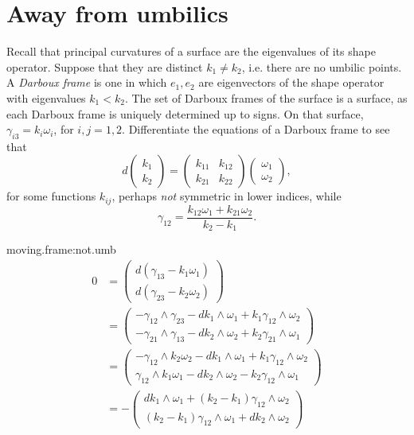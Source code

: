 \section{Away from umbilics}
Recall that principal curvatures of a surface are the eigenvalues of its shape operator.
Suppose that they are distinct \(k_1\ne k_2\), i.e. there are no umbilic points.
A \emph{Darboux frame} is one in which \(e_1,e_2\) are eigenvectors of the shape operator with eigenvalues \(k_1<k_2\).
The set of Darboux frames of the surface is a surface, as each Darboux frame is uniquely determined up to signs.
On that surface, \(\gamma_{i3}=k_i\omega_i\), for \(i,j=1,2\).
%
{Differentiate the equations of a Darboux frame to see that
\[
d
\begin{pmatrix}
k_1\\
k_2
\end{pmatrix}
=
\begin{pmatrix}
k_{11}&k_{12}\\
k_{21}&k_{22}
\end{pmatrix}
\begin{pmatrix}
\omega_1\\
\omega_2
\end{pmatrix},
\]
for some functions \(k_{ij}\), perhaps \emph{not} symmetric in lower indices, while
\[
\gamma_{12}=\frac{k_{12}\omega_1+k_{21}\omega_2}{k_2-k_1}.
\]}
\begin{answer}{moving.frame:not.umb}%
\begin{align*}
0
&=
\begin{pmatrix}
d(\gamma_{13}-k_1\omega_1)\\
d(\gamma_{23}-k_2\omega_2)
\end{pmatrix}
\\
&=
\begin{pmatrix}
-\gamma_{12}\wedge\gamma_{23}-dk_1\wedge\omega_1+k_1\gamma_{12}\wedge\omega_2\\
-\gamma_{21}\wedge\gamma_{13}-dk_2\wedge\omega_2+k_2\gamma_{21}\wedge\omega_1
\end{pmatrix}
\\
&=
\begin{pmatrix}
-\gamma_{12}\wedge k_2\omega_2-dk_1\wedge\omega_1+k_1\gamma_{12}\wedge\omega_2\\
\gamma_{12}\wedge k_1\omega_1-dk_2\wedge\omega_2-k_2\gamma_{12}\wedge\omega_1
\end{pmatrix}
\\
&=
-%
\begin{pmatrix}
dk_1\wedge\omega_1+(k_2-k_1)\gamma_{12}\wedge\omega_2\\
(k_2-k_1)\gamma_{12}\wedge\omega_1+dk_2\wedge\omega_2
\end{pmatrix}
\end{align*}
\end{answer}
